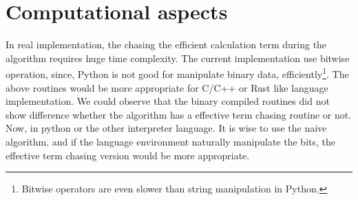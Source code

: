 \documentclass[twocolumn]{article}
\begin{document}
\section{Computational aspects}
In real implementation, the chasing the efficient calculation term during 
the algorithm requires huge time complexity.
The current implementation use bitwise operation, since, Python is not good for 
manipulate binary data, efficiently\footnote{Bitwise operators are even slower than string manipulation in Python.}. 
The above routines would be more appropriate for C/C++ or Rust like language implementation.
We could observe that the binary compiled routines did not show difference 
whether the algorithm has a effective term chasing routine or not.
Now, in python or the other interpreter language. It is wise to use the naive algorithm.
and if the language environment naturally manipulate the bits, the effective term chasing version
would be more appropriate.

\end{document}

